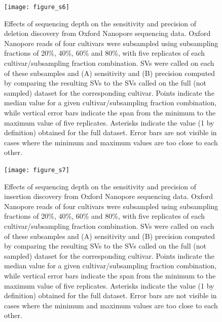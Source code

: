 \documentclass[12pt]{article}
\newenvironment{cfigure}
	{\begin{figure} \centering}
	{\end{figure}}
\begin{document}
\clearpage%

\begin{cfigure}
	\texttt{[image: figure\_s6]}

	\caption[Effects of sequencing depth on the sensitivity and precision of deletion discovery from Oxford Nanopore sequencing data]{
		Effects of sequencing depth on the sensitivity and precision of deletion discovery from Oxford Nanopore sequencing data.
		Oxford Nanopore reads of four cultivars were subsampled using subsampling fractions of 20\%, 40\%, 60\% and 80\%, with five replicates of each cultivar/subsampling fraction combination.
		SVs were called on each of these subsamples and (A) sensitivity and (B) precision computed by comparing the resulting SVs to the SVs called on the full (not sampled) dataset for the corresponding cultivar.
		Points indicate the median value for a given cultivar/subsampling fraction combination, while vertical error bars indicate the span from the minimum to the maximum value of five replicates.
		Asterisks indicate the value (1 by definition) obtained for the full dataset.
		Error bars are not visible in cases where the minimum and maximum values are too close to each other.
}

\label{fig_s6}

\end{cfigure}

\clearpage%

\begin{cfigure}
	\texttt{[image: figure\_s7]}

	\caption[Effects of sequencing depth on the sensitivity and precision of insertion discovery from Oxford Nanopore sequencing data]{
		Effects of sequencing depth on the sensitivity and precision of insertion discovery from Oxford Nanopore sequencing data.
		Oxford Nanopore reads of four cultivars were subsampled using subsampling fractions of 20\%, 40\%, 60\% and 80\%, with five replicates of each cultivar/subsampling fraction combination.
		SVs were called on each of these subsamples and (A) sensitivity and (B) precision computed by comparing the resulting SVs to the SVs called on the full (not sampled) dataset for the corresponding cultivar.
		Points indicate the median value for a given cultivar/subsampling fraction combination, while vertical error bars indicate the span from the minimum to the maximum value of five replicates.
		Asterisks indicate the value (1 by definition) obtained for the full dataset.
		Error bars are not visible in cases where the minimum and maximum values are too close to each other.
}

\label{fig_s7}

\end{cfigure}
\end{document}

